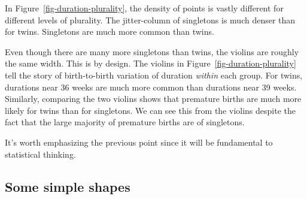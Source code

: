 \documentclass[
  letterpaper,
  DIV=11,
  numbers=noendperiod,
  oneside]{scrartcl}
\begin{document}
\begin{tcolorbox}
\begin{figure}[H]


\end{figure}%

In Figure~\ref{fig-duration-plurality}, the density of points is vastly
different for different levels of plurality. The jitter-column of
singletons is much denser than for twins. Singletons are much more
common than twins.

Even though there are many more singletons than twins, the violins are
roughly the same width. This is by design. The violins in
Figure~\ref{fig-duration-plurality} tell the story of birth-to-birth
variation of duration \emph{within} each group. For twins, durations
near 36 weeks are much more common than durations near 39 weeks.
Similarly, comparing the two violins shows that premature births are
much more likely for twins than for singletons. We can see this from the
violins despite the fact that the large majority of premature births are
of singletons.

It's worth emphasizing the previous point since it will be fundamental
to statistical thinking.

\end{tcolorbox}

\subsection{Some simple shapes}\label{some-simple-shapes}
\end{document}
